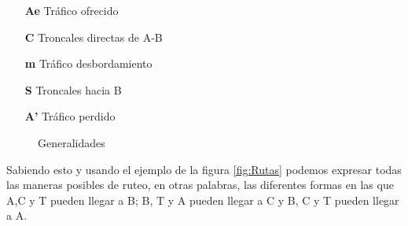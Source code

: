 \documentclass[
	12pt, %
	fleqn, %
	a4paper, %
	oneside, %
]{LegrandOrangeBook}
\begin{document}
\begin{itemize}
\item[\textbf{Ae}] Tráfico ofrecido
\item[\textbf{C}] Troncales directas de A-B
\item[\textbf{m}]  Tráfico desbordamiento
\item[\textbf{S}] Troncales hacia B
\item[\textbf{A'}] Tráfico perdido
\end{itemize}
\begin{figure}[H]
\centering
{}
\caption{Generalidades}
\end{figure}
Sabiendo esto y usando el ejemplo de la figura \ref{fig:Rutas} podemos expresar todas las maneras posibles de ruteo, en otras palabras, las diferentes formas en las que A,C y T pueden llegar a B; B, T y A pueden llegar a C y B, C y T pueden llegar a A.
\end{document}
